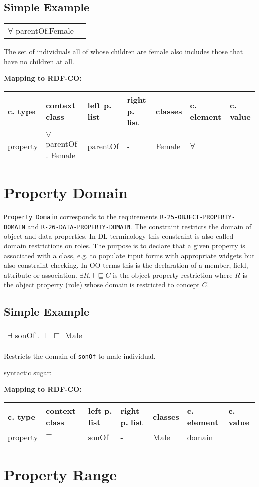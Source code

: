 \documentclass{llncs}
\newcommand{\ms}[1]{\texttt{#1}}
\newenvironment{gcotable}{
  \scriptsize
  \sffamily
  \vspace{0cm}
	\begin{center}
	\textbf{\vspace{0.4cm}Mapping to RDF-CO:} \\
  \begin{tabular}{l|l|l|l|l|l|l}
	\hline
  \textbf{c. type} & \textbf{context class} & \textbf{left p. list} & \textbf{right p. list} & \textbf{classes} & \textbf{c. element} & \textbf{c. value} \\
  \hline

}{
  \hline
  \end{tabular}
	\end{center}
}
\newenvironment{DL}{
  \vspace{0cm}
	\begin{center}
  \begin{tabular}{r l}

}{
  \end{tabular}
	\end{center}
}
\begin{document}
\subsection{Simple Example}

\begin{DL}
$\forall$ parentOf.Female
\end{DL}

The set of individuals all of whose children are female also includes those that have no children at all.

\begin{gcotable}
property & $\forall$ parentOf . Female & parentOf & - & Female & $\forall$ \\
\end{gcotable}

\section{Property Domain}

\ms{Property Domain} corresponds to the requirements \ms{R-25-OBJECT-PROPERTY-DOMAIN} and \ms{R-26-DATA-PROPERTY-DOMAIN}.
The constraint restricts the domain of object and data properties.
In DL terminology this constraint is also called domain restrictions on roles.
The purpose is to declare that a given property is associated with a class, e.g. to populate input forms with appropriate widgets but also constraint checking. In OO terms this is the declaration of a member, field, attribute or association. 
$\exists R. \top \sqsubseteq C$ is the object property restriction where $R$ is the object property (role) whose domain is restricted to concept $C$.

\subsection{Simple Example}

\begin{DL}
$\exists$ sonOf . $\top$ $\sqsubseteq$ Male 
\end{DL}

Restricts the domain of \ms{sonOf} to male individual.

syntactic sugar:

\begin{gcotable}
property & $\top$ & sonOf & - & Male & domain \\
\end{gcotable}

\section{Property Range}
\end{document}
